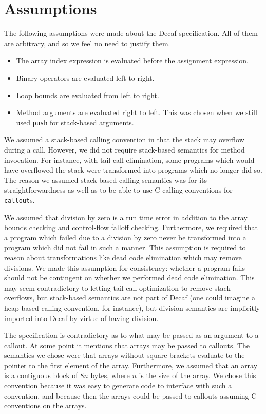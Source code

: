 \documentclass[11pt]{article}
\begin{document}
\section{Assumptions}

The following assumptions were made about the Decaf specification.
All of them are arbitrary, and so we feel no need to justify them.
\begin{itemize}
\item The array index expression is evaluated before the assignment
  expression.
\item Binary operators are evaluated left to right.
\item Loop bounds are evaluated from left to right.
\item Method arguments are evaluated right to left.  This was chosen
  when we still used \texttt{push} for stack-based arguments.
\end{itemize}

We assumed a stack-based calling convention in that the stack may
overflow during a call.  However, we did not require stack-based
semantics for method invocation.  For instance, with tail-call
elimination, some programs which would have overflowed the stack were
transformed into programs which no longer did so.  The reason we
assumed stack-based calling semantics was for its straightforwardness
as well as to be able to use C calling conventions for
\texttt{callout}s.

We assumed that division by zero is a run time error in addition to
the array bounds checking and control-flow falloff checking.
Furthermore, we required that a program which failed due to a division
by zero never be transformed into a program which did not fail in such
a manner.  This assumption is required to reason about transformations
like dead code elimination which may remove divisions.  We made this
assumption for consistency: whether a program fails should not be
contingent on whether we performed dead code elimination.  This may
seem contradictory to letting tail call optimization to remove stack
overflows, but stack-based semantics are not part of Decaf (one could
imagine a heap-based calling convention, for instance), but division
semantics are implicitly imported into Decaf by virtue of having
division.

The specification is contradictory as to what may be passed as an
argument to a callout.  At some point it mentions that arrays may be
passed to callouts.  The semantics we chose were that arrays without
square brackets evaluate to the pointer to the first element of the
array.  Furthermore, we assumed that an array is a contiguous block of
$8n$ bytes, where $n$ is the size of the array.  We chose this
convention because it was easy to generate code to interface with such
a convention, and because then the arrays could be passed to callouts
assuming C conventions on the arrays.
\end{document}
